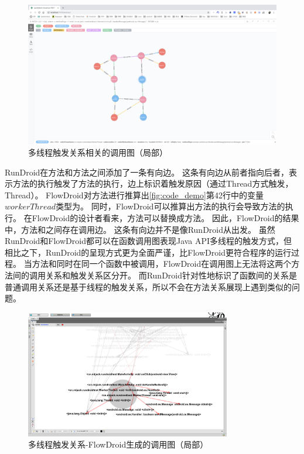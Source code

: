 \begin{figure}[ht]
	\centering
	\includegraphics[width=\textwidth]{./Figures/android-handler-rundroid.png}
	\caption{多线程触发关系相关的调用图（局部）}
	\label{fig:rundroid-result-handler}
\end{figure}







RunDroid在方法和方法之间添加了一条有向边。
这条有向边从前者指向后者，表示方法的执行触发了方法的执行，边上标识着触发原因（通过Thread方式触发，Thread）。
FlowDroid对方法进行推算出\autoref{fig:code_demo}第42行中的变量$workerThread$类型为。
同时，FlowDroid可以推算出方法的执行会导致方法的执行。
在FlowDroid的设计者看来，方法可以替换成方法。
因此，FlowDroid的结果中，方法和之间存在调用边。
这条有向边并不是像RunDroid从出发。
虽然RunDroid和FlowDroid都可以在函数调用图表现Java API多线程的触发方式，但相比之下，RunDroid的呈现方式更为全面严谨，比FlowDroid更符合程序的运行过程。
当方法和同时在同一个函数中被调用，FlowDroid在调用图上无法将这两个方法间的调用关系和触发关系区分开。
而RunDroid针对性地标识了函数间的关系是普通调用关系还是基于线程的触发关系，所以不会在方法关系展现上遇到类似的问题。

\begin{figure}[ht]
	\centering
	\includegraphics[width=0.8\textwidth]{./Figures/FlowDroid-handler.png}
	\caption{多线程触发关系-FlowDroid生成的调用图（局部）}
	\label{fig:flowdroid-result-handler}
\end{figure}

